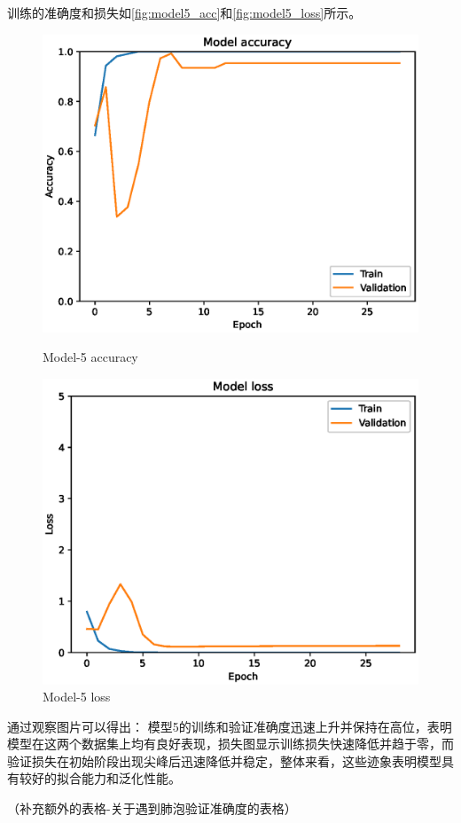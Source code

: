 训练的准确度和损失如\autoref{fig:model5_acc}和\autoref{fig:model5_loss}所示。
\begin{figure}
    \centering
    \begin{minipage}{0.45\textwidth}
        \centering
        \includegraphics[width=\textwidth]{./fig/fish_lung/accuracy5.eps}
        \caption{Model-5 accuracy}
        \label{fig:model5_acc}
    \end{minipage}
    \begin{minipage}{0.45\textwidth}
        \centering
        \includegraphics[width=\textwidth]{./fig/fish_lung/loss5.eps}
        \caption{Model-5 loss}
        \label{fig:model5_loss}
    \end{minipage}
\end{figure}

通过观察图片可以得出：
模型5的训练和验证准确度迅速上升并保持在高位，表明模型在这两个数据集上均有良好表现，损失图显示训练损失快速降低并趋于零，而验证损失在初始阶段出现尖峰后迅速降低并稳定，整体来看，这些迹象表明模型具有较好的拟合能力和泛化性能。

（补充额外的表格-关于遇到肺泡验证准确度的表格）



\FloatBarrier